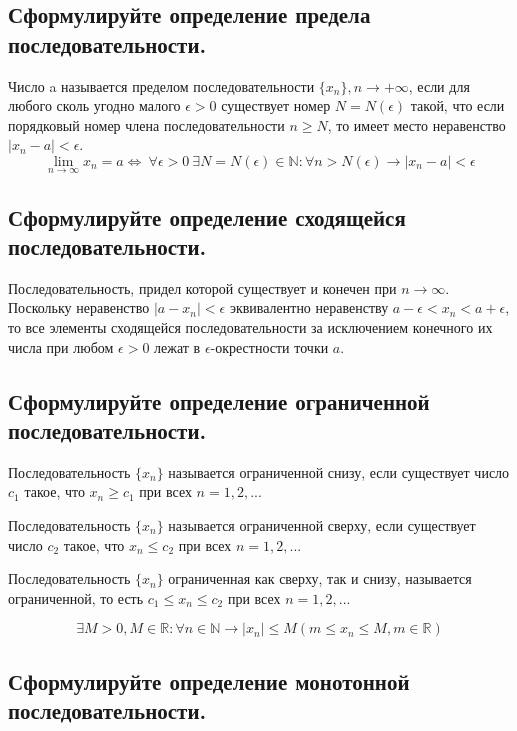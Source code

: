 \documentclass[a4paper, 10pt]{article}
\begin{document}
    \subsection{Сформулируйте определение предела последовательности.}
    
    Число a называется пределом последовательности $\{x_n\}, n \to +\infty$, если для любого 
    сколь угодно малого $\epsilon > 0$ существует номер $N = N(\epsilon)$ такой, что 
    если порядковый номер члена последовательности $n  \geqslant  N$, то имеет место неравенство 
    $|x_n - a| < \epsilon$. 
    $$\lim\limits_{n \to \infty} x_n = a \iff \ \forall \epsilon > 0 \  \exists N = N(\epsilon) \in 
    \mathbb{N} : \forall n > N(\epsilon) \longrightarrow |x_n - a| < \epsilon$$
    
    \subsection{Сформулируйте определение сходящейся последовательности.}

    Последовательность, придел которой существует и конечен при $n \to \infty$. Поскольку 
    неравенство $|a - x_n| < \epsilon$ эквивалентно неравенству 
    $a - \epsilon < x_n < a + \epsilon$, то все элементы сходящейся последовательности 
    за исключением конечного их числа при любом $\epsilon > 0$ лежат в $\epsilon$-окрестности 
    точки $a$.

    \subsection{Сформулируйте определение ограниченной последовательности.}

    Последовательность $\{x_n\}$ называется ограниченной снизу, если существует число $c_1$
    такое, что $x_n  \geqslant  c_1$ при всех $n = 1, 2, ...$

    Последовательность $\{x_n\}$ называется ограниченной сверху, если существует число $c_2$
    такое, что $x_n  \leqslant  c_2$ при всех $n = 1, 2, ...$

    Последовательность $\{x_n\}$ ограниченная как сверху, так и снизу, называется ограниченной,
    то есть $c_1  \leqslant  x_n  \leqslant  c_2$ при всех $n = 1, 2, ...$

    $$\exists M > 0, M \in \mathbb{R}: \forall n \in \mathbb{N} \longrightarrow |x_n|  \leqslant  M 
    (m  \leqslant  x_n  \leqslant  M, m \in \mathbb{R})$$

    \subsection{Сформулируйте определение монотонной последовательности.}
    
\end{document}
